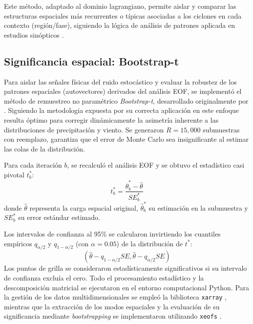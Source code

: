 Este método, adaptado al dominio lagrangiano, permite aislar y comparar las estructuras espaciales más recurrentes o típicas asociadas a los ciclones en cada contexto (región/fase), siguiendo la lógica de análisis de patrones aplicada en estudios sinópticos \citep{vera2002cold}.

\subsection{Significancia espacial: Bootstrap-t}\label{subsec:bootstrap_significancia}

Para aislar las señales físicas del ruido estocástico y evaluar la robustez de los patrones espaciales (autovectores) derivados del análisis EOF, se implementó el método de remuestreo no paramétrico \textit{Bootstrap-t}, desarrollado originalmente por \citet{efron1993introduction}. Siguiendo la metodologia expuesta por \citet{hesterberg2015bootstrap} su correcta aplicación en este enfoque resulta óptimo para corregir dinámicamente la asimetría inherente a las distribuciones de precipitación y viento. Se generaron $R = 15,000$ submuestras con reemplazo, garantiza que el error de Monte Carlo sea insignificante al estimar las colas de la distribución.

Para cada iteración $b$, se recalculó el análisis EOF y se obtuvo el estadístico casi pivotal $t^*_b$:
\begin{equation}
    t^*_b = \frac{\hat{\theta}^*_b - \hat{\theta}}{SE^*_b}
\end{equation}
donde $\hat{\theta}$ representa la carga espacial original, $\hat{\theta}^*_b$ su estimación en la submuestra y $SE^*_b$ su error estándar estimado.

Los intervalos de confianza al 95\% se calcularon invirtiendo los cuantiles empíricos $q_{\alpha/2}$ y $q_{1-\alpha/2}$ (con $\alpha = 0.05$) de la distribución de $t^*$:
\begin{equation}
    (\hat{\theta} - q_{1-\alpha/2}SE, \hat{\theta} - q_{\alpha/2}SE)
\end{equation}
Los puntos de grilla se consideraron estadísticamente significativos si su intervalo de confianza excluía el cero. 
Todo el procesamiento estadístico y la descomposición matricial se ejecutaron en el entorno computacional Python. 
Para la gestión de los datos multidimensionales se empleó la biblioteca \texttt{xarray} \citep{hoyer2017xarray}, mientras que la extracción de los modos espaciales y la evaluación de su significancia mediante \textit{bootstrapping} se implementaron utilizando \texttt{xeofs} \citep{rieger2024xeofs}.

